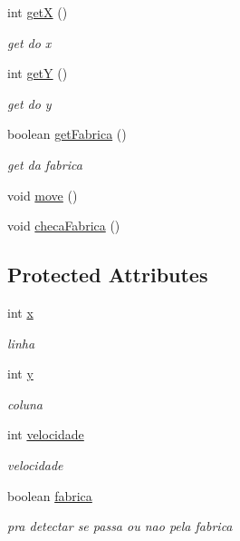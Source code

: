 \begin{DoxyCompactItemize}
int \mbox{\hyperlink{class_veiculo_a235b29e1e25ec8c769b20fb2aeba8404}{getX}} ()
\begin{DoxyCompactList}\small\item\em get do x \end{DoxyCompactList}\item 
int \mbox{\hyperlink{class_veiculo_a06b2a923e51186673a016f75d10363d3}{getY}} ()
\begin{DoxyCompactList}\small\item\em get do y \end{DoxyCompactList}\item 
boolean \mbox{\hyperlink{class_veiculo_a6447f0eeb99399f1f96e835c22a88479}{get\+Fabrica}} ()
\begin{DoxyCompactList}\small\item\em get da fabrica \end{DoxyCompactList}\item 
void \mbox{\hyperlink{class_veiculo_a3341b0ed6b4d34db990a31f7a499ae80}{move}} ()
\item 
void \mbox{\hyperlink{class_veiculo_aa0233fb9ba21481a8f43780270a5f9ec}{checa\+Fabrica}} ()
\end{DoxyCompactItemize}
\subsection*{Protected Attributes}
\begin{DoxyCompactItemize}
\item 
int \mbox{\hyperlink{class_veiculo_a069917a284297fe5b385258b2afd9ad6}{x}}
\begin{DoxyCompactList}\small\item\em linha \end{DoxyCompactList}\item 
int \mbox{\hyperlink{class_veiculo_af25046404db7c2786c0d9e468bb1fb64}{y}}
\begin{DoxyCompactList}\small\item\em coluna \end{DoxyCompactList}\item 
int \mbox{\hyperlink{class_veiculo_a2edf5e3132b1c2504c441dc095dc7e0e}{velocidade}}
\begin{DoxyCompactList}\small\item\em velocidade \end{DoxyCompactList}\item 
boolean \mbox{\hyperlink{class_veiculo_a23d377a69bdf558ebedb5bc35dcdebf5}{fabrica}}
\begin{DoxyCompactList}\small\item\em pra detectar se passa ou nao pela fabrica \end{DoxyCompactList}\end{DoxyCompactItemize}


